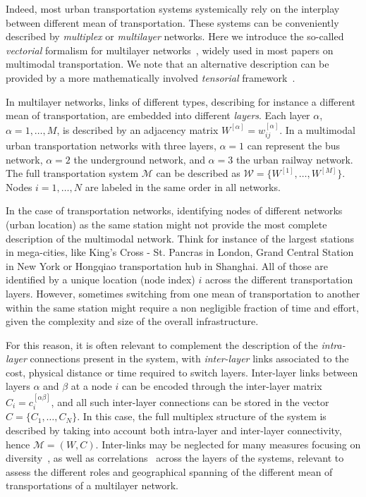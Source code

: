 Indeed, most urban transportation systems systemically rely on the interplay between different mean of transportation. These systems can be conveniently described by \textit{multiplex} or \textit{multilayer} networks. Here we introduce the so-called \textit{vectorial} formalism for multilayer networks~\cite{boccaletti2014structure, battiston2014structural}, widely used in most papers on multimodal transportation. We note that an alternative description can be provided by a more mathematically involved \textit{tensorial} framework~\cite{dedomenico2013mathematical, kivela2014multilayer}.  

In multilayer networks, links of different types, describing for instance a different mean of transportation, are embedded into different \textit{layers}. Each layer $\alpha$, $\alpha = 1, \ldots, M$, is described by an adjacency matrix 
$ W^{[\alpha]} = w_{ij}^{[\alpha]}$. In a multimodal urban transportation networks with three layers, $\alpha=1$ can represent the bus network, $\alpha=2$ the underground network, and $\alpha=3$ the urban railway network. The full transportation system $\mathcal M$ can be described as $\mathcal W = \{W^{[1]}, \ldots,  W^{[M]}\}$. Nodes $i=1, \dots, N$ are labeled in the same order in all networks. 

In the case of transportation networks, identifying nodes of different networks (urban location) as the same station might not provide the most complete description of the multimodal network. Think for instance of the largest stations in mega-cities, like King's Cross - St. Pancras in London, Grand Central Station in New York or Hongqiao transportation hub in Shanghai. All of those are identified by a unique location (node index) $i$ across the different transportation layers. However, sometimes switching from one mean of transportation to another within the same station might require a non negligible fraction of time and effort, given the complexity and size of the overall infrastructure. 

For this reason, it is often relevant to complement the description of the \textit{intra-layer} connections present in the system, with \textit{inter-layer} links associated to the cost, physical distance or time required to switch layers. Inter-layer links between layers $\alpha$ and $\beta$ at a node $i$ can be encoded through the inter-layer matrix $C_i=c_i^{[\alpha \beta]}$, and all such inter-layer connections can be stored in the vector $ C = \{C_1, \ldots, C_N\}$. In this case, the full multiplex structure of the system is described by taking into account both intra-layer and inter-layer connectivity, hence $\mathcal M = (W,  C)$. Inter-links may be neglected for many measures focusing on diversity~\cite{battiston2014structural}, as well as correlations~\cite{nicosia2015measuring} across the layers of the systems, relevant to assess the different roles and geographical spanning of the different mean of transportations of a multilayer network. 

